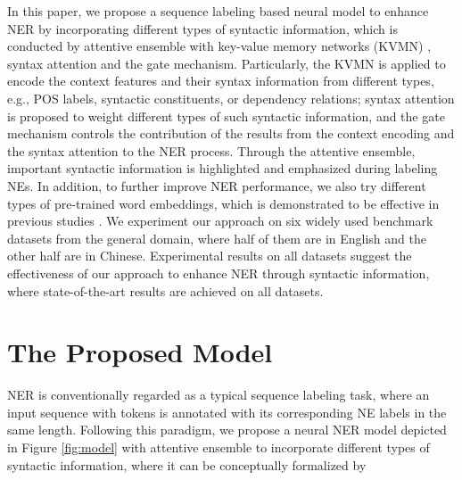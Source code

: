 \documentclass[11pt,a4paper]{article}
\begin{document}
In this paper, we propose a sequence labeling based neural model to enhance NER by incorporating different types of
syntactic information,
which is conducted by
attentive ensemble with key-value memory networks (KVMN) \cite{miller2016key}, syntax attention and the gate mechanism.
Particularly, the KVMN is applied to encode the context features and their syntax information from different types, e.g., POS labels, syntactic constituents, or dependency relations;
syntax attention is proposed to weight different types of such syntactic information, and the gate mechanism controls the contribution of the results from the context encoding and the syntax attention to the NER process.
Through the attentive ensemble, important syntactic information is highlighted and emphasized during labeling NEs.
In addition, to further improve NER performance, we also try different types of pre-trained word embeddings, which is demonstrated to be effective in previous studies \cite{DBLP:conf/coling/AkbikBV18,DBLP:conf/emnlp/JieL19,DBLP:conf/acl/LiuYL19,DBLP:journals/corr/abs-1911-04474}.
We experiment our approach on six widely used benchmark datasets from the general domain, where half of them are in English and the other half are in Chinese.
Experimental results on all datasets suggest the effectiveness of our approach 
to enhance NER through syntactic information, where state-of-the-art results are achieved on all datasets.








\section{The Proposed Model}
\label{model}






NER is conventionally regarded as a typical
sequence labeling task, where an input sequence  with  tokens is annotated with its corresponding NE labels  in the same length.
Following this paradigm, we propose a neural NER model depicted in Figure \ref{fig:model}
with attentive ensemble to incorporate different types of
syntactic information,
where it can be conceptually formalized by
\end{document}
